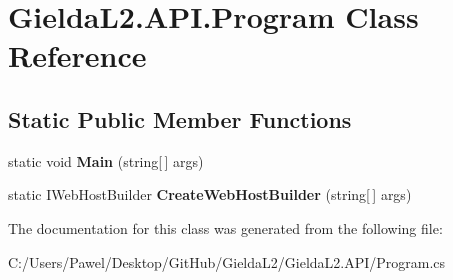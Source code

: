 \hypertarget{class_gielda_l2_1_1_a_p_i_1_1_program}{}\section{Gielda\+L2.\+A\+P\+I.\+Program Class Reference}
\label{class_gielda_l2_1_1_a_p_i_1_1_program}
\subsection*{Static Public Member Functions}
\begin{DoxyCompactItemize}
\item 
\mbox{\label{class_gielda_l2_1_1_a_p_i_1_1_program_a4eae1b1a40be00d8d99ec85a7712d565}} 
static void {\bfseries Main} (string\mbox{[}$\,$\mbox{]} args)
\item 
\mbox{\label{class_gielda_l2_1_1_a_p_i_1_1_program_aed9c8df6403b1abe58e5db7d6bbb84d0}} 
static I\+Web\+Host\+Builder {\bfseries Create\+Web\+Host\+Builder} (string\mbox{[}$\,$\mbox{]} args)
\end{DoxyCompactItemize}


The documentation for this class was generated from the following file\+:\begin{DoxyCompactItemize}
\item 
C\+:/\+Users/\+Pawel/\+Desktop/\+Git\+Hub/\+Gielda\+L2/\+Gielda\+L2.\+A\+P\+I/Program.\+cs\end{DoxyCompactItemize}

